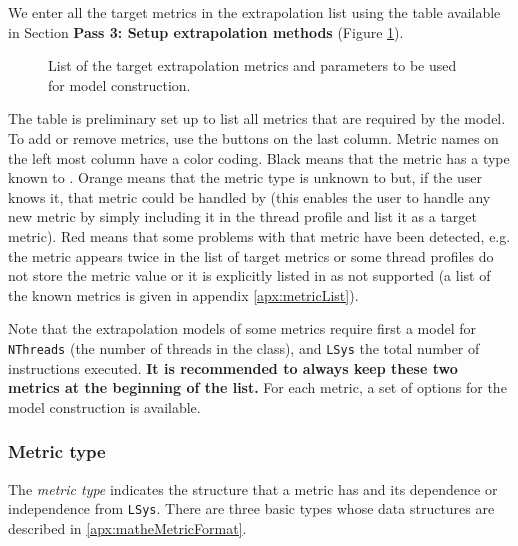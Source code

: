 \documentclass[a4paper, 10pt]{article}
\begin{document}
We enter all the target metrics in the extrapolation list using the table available in Section \textbf{Pass 3: Setup extrapolation methods}
(Figure \ref{fig:extrapolationList}).

\begin{figure}[h!]
\centering
{}
\caption{List of the target extrapolation metrics and parameters to be used for model construction.}
\label{fig:extrapolationList}
\end{figure}

The table is preliminary set up to list all metrics that are required by the \eb model. To add or remove metrics, use the buttons on the last column.
Metric names on the left most column have a color coding. Black means that the metric has a type known to \ex.
Orange means that the metric type is unknown to \ex but, if the user knows it, that metric could be handled by \ex
(this enables the user to handle any new metric by simply including it in the thread profile
and list it as a target metric).
Red means that some problems with that metric have been detected, e.g. the metric appears twice in the list of target metrics 
or some thread profiles do not store the metric value or it is explicitly listed in \ex as not supported
(a list of the known metrics is given in appendix \ref{apx:metricList}).

Note that the extrapolation models of some metrics require first a
model for \verb!NThreads! (the number of threads in the class),
and \verb!LSys! the total number of instructions executed. \textbf{It is recommended to always keep these two metrics at the beginning of the list.}
For each metric, a set of options for the model construction is available.

\subsubsection{Metric type}
\label{sec:mType}

The \textit{metric type} indicates the structure that a metric has and its dependence or independence from \verb!LSys!.
There are three basic types whose \mathe data structures are described in \ref{apx:matheMetricFormat}.
\end{document}
